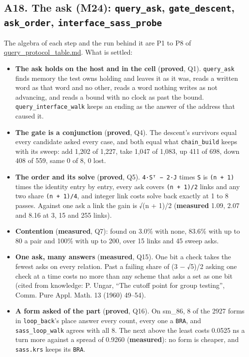 \subsection{\texorpdfstring{A18. The ask (M24): \texttt{query\_\allowbreak{}ask}, \texttt{gate\_\allowbreak{}descent}, \texttt{ask\_\allowbreak{}order}, \texttt{interface\_\allowbreak{}sass\_\allowbreak{}probe}}{A18. The ask (M24): query\_ask, gate\_descent, ask\_order, interface\_sass\_probe}}

The algebra of each step and the run behind it are P1 to P8 of \hyperref[chap:query-protocol-table]{query\_\allowbreak{}protocol\_\allowbreak{}table.md}. What is settled:

\begin{itemize}
\item \textbf{The ask holds on the host and in the cell} (\textbf{proved}, Q1). \texttt{query\_\allowbreak{}ask} finds memory the test owns holding and leaves it as it was, reads a written word as that word and no other, reads a word nothing writes as not advancing, and reads a bound with no clock as past the bound. \texttt{query\_\allowbreak{}interface\_\allowbreak{}walk} keeps an ending as the answer of the address that caused it.
\item \textbf{The gate is a conjunction} (\textbf{proved}, Q4). The descent's survivors equal every candidate asked every case, and both equal what \texttt{chain\_\allowbreak{}build} keeps with its sweep: add 1,202 of 1,227, take 1,047 of 1,083, up 411 of 698, down 408 of 559, same 0 of 8, 0 lost.
\item \textbf{The order and its solve} (\textbf{proved}, Q5). \texttt{4·Sᵀ − 2·J} times \texttt{S} is \texttt{(n + 1)} times the identity entry by entry, every ask covers \texttt{(n + 1)/\allowbreak{}2} links and any two share \texttt{(n + 1)/\allowbreak{}4}, and integer link costs solve back exactly at 1 to 8 passes. Against one ask a link the gain is √(n + 1)/2 (\textbf{measured} 1.09, 2.07 and 8.16 at 3, 15 and 255 links).
\item \textbf{Contention} (\textbf{measured}, Q7): found on 3.0\% with none, 83.6\% with up to 80 a pair and 100\% with up to 200, over 15 links and 45 sweep asks.
\item \textbf{One ask, many answers} (\textbf{measured}, Q15). One bit a check takes the fewest asks on every relation. Past a failing share of (3 − √5)/2 asking one check at a time costs no more than any scheme that asks a set as one bit (cited from knowledge: P. Ungar, “The cutoff point for group testing”, Comm. Pure Appl. Math. 13 (1960) 49–54).
\item \textbf{A form asked of the part} (\textbf{proved}, Q16). On sm\_\allowbreak{}86, 8 of the 2927 forms in \texttt{loop\_\allowbreak{}back}'s place answer every count, every one a \texttt{BRA}, and \texttt{sass\_\allowbreak{}loop\_\allowbreak{}walk} agrees with all 8. The next above the least costs 0.0525 ns a turn more against a spread of 0.9260 (\textbf{measured}): no form is cheaper, and \texttt{sass.\allowbreak{}krs} keeps its \texttt{BRA}.
\end{itemize}

